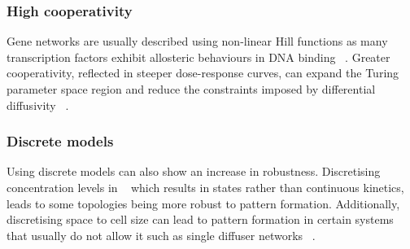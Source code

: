 \subsubsection{High cooperativity}
Gene networks are usually described using non-linear Hill functions as many transcription factors exhibit allosteric behaviours in DNA binding ~\parencite{Morgunova2017}.
Greater cooperativity, reflected in steeper dose-response curves, can expand the Turing parameter space region and reduce the constraints imposed by differential diffusivity ~\parencite{Diambra2015a}.
%
%

\subsubsection{Discrete models}
Using discrete models can also show an increase in robustness.
Discretising concentration levels in ~\cite{Leyshon2021} which results in states rather than continuous kinetics, leads to some topologies being more robust to pattern formation. %
Additionally, discretising space to cell size can lead to pattern formation in certain systems that usually do not allow it such as single diffuser networks ~\parencite{Wang2022}.

